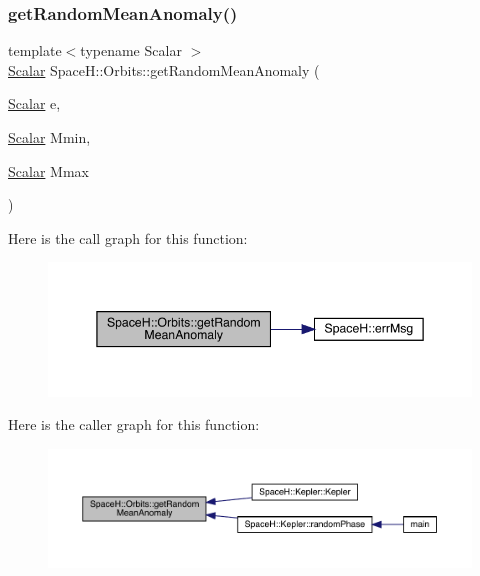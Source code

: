 \subsubsection{\texorpdfstring{get\+Random\+Mean\+Anomaly()}{getRandomMeanAnomaly()}}
{\footnotesize\ttfamily template$<$typename Scalar $>$ \\
\mbox{\hyperlink{create_kepler_8cpp_a8c2981f3f834be9448a6ab06c28748eb}{Scalar}} Space\+H\+::\+Orbits\+::get\+Random\+Mean\+Anomaly (\begin{DoxyParamCaption}\item[{\mbox{\hyperlink{create_kepler_8cpp_a8c2981f3f834be9448a6ab06c28748eb}{Scalar}}}]{e,  }\item[{\mbox{\hyperlink{create_kepler_8cpp_a8c2981f3f834be9448a6ab06c28748eb}{Scalar}}}]{Mmin,  }\item[{\mbox{\hyperlink{create_kepler_8cpp_a8c2981f3f834be9448a6ab06c28748eb}{Scalar}}}]{Mmax }\end{DoxyParamCaption})}

Here is the call graph for this function\+:
\nopagebreak
\begin{figure}[H]
\begin{center}
\leavevmode
\includegraphics[width=345pt]{namespace_space_h_1_1_orbits_ab0a6bf4bbce5725fa15cc6250057817c_cgraph}
\end{center}
\end{figure}
Here is the caller graph for this function\+:
\nopagebreak
\begin{figure}[H]
\begin{center}
\leavevmode
\includegraphics[width=350pt]{namespace_space_h_1_1_orbits_ab0a6bf4bbce5725fa15cc6250057817c_icgraph}
\end{center}
\end{figure}
\mbox{\label{namespace_space_h_1_1_orbits_a43d1a07ed25eaf775f3a83d7000a2596}} 
